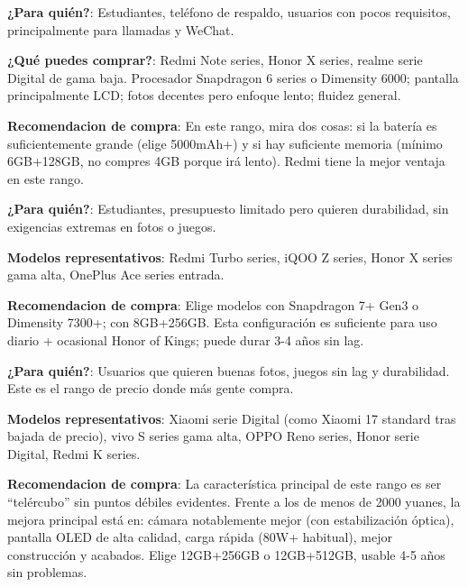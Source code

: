 
\textbf{¿Para quién?}: Estudiantes, teléfono de respaldo, usuarios con pocos requisitos, principalmente para llamadas y WeChat.

\textbf{¿Qué puedes comprar?}: Redmi Note series, Honor X series, realme serie Digital de gama baja. Procesador Snapdragon 6 series o Dimensity 6000; pantalla principalmente LCD; fotos decentes pero enfoque lento; fluidez general.

\textbf{Recomendacion de compra}: En este rango, mira dos cosas: si la batería es suficientemente grande (elige 5000mAh+) y si hay suficiente memoria (mínimo 6GB+128GB, no compres 4GB porque irá lento). Redmi tiene la mejor ventaja en este rango.


\textbf{¿Para quién?}: Estudiantes, presupuesto limitado pero quieren durabilidad, sin exigencias extremas en fotos o juegos.

\textbf{Modelos representativos}: Redmi Turbo series, iQOO Z series, Honor X series gama alta, OnePlus Ace series entrada.

\textbf{Recomendacion de compra}: Elige modelos con Snapdragon 7+ Gen3 o Dimensity 7300+; con 8GB+256GB. Esta configuración es suficiente para uso diario + ocasional Honor of Kings; puede durar 3-4 años sin lag.


\textbf{¿Para quién?}: Usuarios que quieren buenas fotos, juegos sin lag y durabilidad. Este es el rango de precio donde más gente compra.

\textbf{Modelos representativos}: Xiaomi serie Digital (como Xiaomi 17 standard tras bajada de precio), vivo S series gama alta, OPPO Reno series, Honor serie Digital, Redmi K series.

\textbf{Recomendacion de compra}: La característica principal de este rango es ser “telércubo” sin puntos débiles evidentes. Frente a los de menos de 2000 yuanes, la mejora principal está en: cámara notablemente mejor (con estabilización óptica), pantalla OLED de alta calidad, carga rápida (80W+ habitual), mejor construcción y acabados. Elige 12GB+256GB o 12GB+512GB, usable 4-5 años sin problemas.


